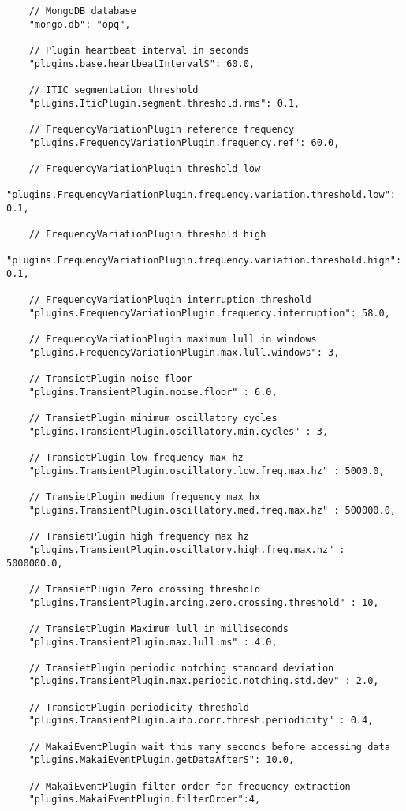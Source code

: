 \begin{lstlisting}
	// MongoDB database
	"mongo.db": "opq",

	// Plugin heartbeat interval in seconds
	"plugins.base.heartbeatIntervalS": 60.0,

	// ITIC segmentation threshold
	"plugins.IticPlugin.segment.threshold.rms": 0.1,

	// FrequencyVariationPlugin reference frequency
	"plugins.FrequencyVariationPlugin.frequency.ref": 60.0,

	// FrequencyVariationPlugin threshold low
	"plugins.FrequencyVariationPlugin.frequency.variation.threshold.low": 0.1,

	// FrequencyVariationPlugin threshold high
	"plugins.FrequencyVariationPlugin.frequency.variation.threshold.high": 0.1,

	// FrequencyVariationPlugin interruption threshold
	"plugins.FrequencyVariationPlugin.frequency.interruption": 58.0,

	// FrequencyVariationPlugin maximum lull in windows
	"plugins.FrequencyVariationPlugin.max.lull.windows": 3,

	// TransietPlugin noise floor
	"plugins.TransientPlugin.noise.floor" : 6.0,

	// TransietPlugin minimum oscillatory cycles
	"plugins.TransientPlugin.oscillatory.min.cycles" : 3,

	// TransietPlugin low frequency max hz
	"plugins.TransientPlugin.oscillatory.low.freq.max.hz" : 5000.0,

	// TransietPlugin medium frequency max hx
	"plugins.TransientPlugin.oscillatory.med.freq.max.hz" : 500000.0,

	// TransietPlugin high frequency max hz
	"plugins.TransientPlugin.oscillatory.high.freq.max.hz" : 5000000.0,

	// TransietPlugin Zero crossing threshold
	"plugins.TransientPlugin.arcing.zero.crossing.threshold" : 10,

	// TransietPlugin Maximum lull in milliseconds
	"plugins.TransientPlugin.max.lull.ms" : 4.0,

	// TransietPlugin periodic notching standard deviation
	"plugins.TransientPlugin.max.periodic.notching.std.dev" : 2.0,

	// TransietPlugin periodicity threshold
	"plugins.TransientPlugin.auto.corr.thresh.periodicity" : 0.4,

	// MakaiEventPlugin wait this many seconds before accessing data
	"plugins.MakaiEventPlugin.getDataAfterS": 10.0,

	// MakaiEventPlugin filter order for frequency extraction
	"plugins.MakaiEventPlugin.filterOrder":4,


\end{lstlisting}
